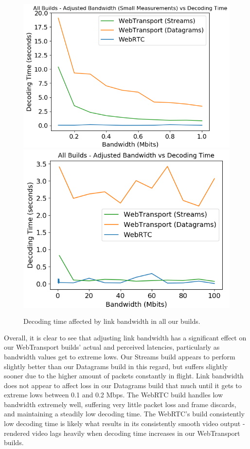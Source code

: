 \begin{figure}[h]
    \centering
    \includegraphics[width=0.51\linewidth]{images/bandwidth/all-bw-decoding-small.png}    
    \includegraphics[width=0.48\linewidth]{images/bandwidth/all-bw-decoding.png}    
    \caption{Decoding time affected by link bandwidth in all our builds.}

    \label{fig:all-bw-decoding} 
\end{figure}

Overall, it is clear to see that adjusting link bandwidth has a significant effect on our WebTransport builds' actual and perceived latencies, particularly as bandwidth values get to extreme lows. Our Streams build appears to perform slightly better than our Datagrams build in this regard, but suffers slightly sooner due to the higher amount of packets constantly in flight. Link bandwidth does not appear to affect loss in our Datagrams build that much until it gets to extreme lows between 0.1 and 0.2 Mbps. The WebRTC build handles low bandwidth extremely well, suffering very little packet loss and frame discards, and maintaining a steadily low decoding time. The WebRTC's build consistently low decoding time is likely what results in its consistently smooth video output - rendered video lags heavily when decoding time increases in our WebTransport builds.
\hfill{} \\

